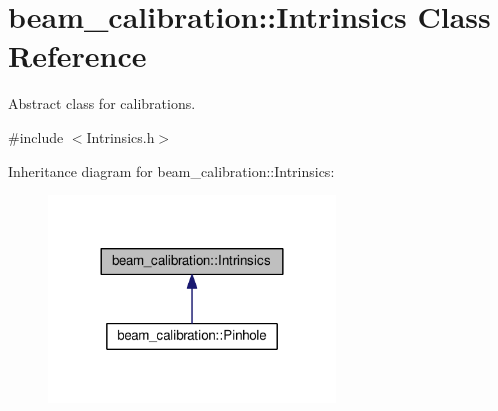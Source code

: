 \hypertarget{classbeam__calibration_1_1_intrinsics}{}\section{beam\+\_\+calibration\+:\+:Intrinsics Class Reference}
\label{classbeam__calibration_1_1_intrinsics}


Abstract class for calibrations.  




{\ttfamily \#include $<$Intrinsics.\+h$>$}



Inheritance diagram for beam\+\_\+calibration\+:\+:Intrinsics\+:\nopagebreak
\begin{figure}[H]
\begin{center}
\leavevmode
\includegraphics[width=216pt]{classbeam__calibration_1_1_intrinsics__inherit__graph}
\end{center}
\end{figure}
